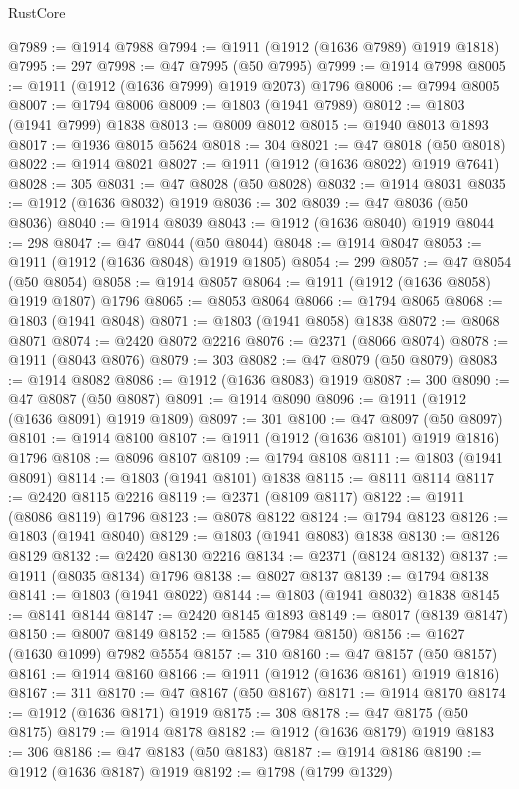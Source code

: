 \begin{lexlean}{RustCore}
\begin{coremodule}
@7989 := @1914 @7988
@7994 := @1911 (@1912 (@1636 @7989) @1919 @1818)
@7995 := 297
@7998 := @47 @7995 (@50 @7995)
@7999 := @1914 @7998
@8005 := @1911 (@1912 (@1636 @7999) @1919 @2073) @1796
@8006 := @7994 @8005
@8007 := @1794 @8006
@8009 := @1803 (@1941 @7989)
@8012 := @1803 (@1941 @7999) @1838
@8013 := @8009 @8012
@8015 := @1940 @8013 @1893
@8017 := @1936 @8015 @5624
@8018 := 304
@8021 := @47 @8018 (@50 @8018)
@8022 := @1914 @8021
@8027 := @1911 (@1912 (@1636 @8022) @1919 @7641)
@8028 := 305
@8031 := @47 @8028 (@50 @8028)
@8032 := @1914 @8031
@8035 := @1912 (@1636 @8032) @1919
@8036 := 302
@8039 := @47 @8036 (@50 @8036)
@8040 := @1914 @8039
@8043 := @1912 (@1636 @8040) @1919
@8044 := 298
@8047 := @47 @8044 (@50 @8044)
@8048 := @1914 @8047
@8053 := @1911 (@1912 (@1636 @8048) @1919 @1805)
@8054 := 299
@8057 := @47 @8054 (@50 @8054)
@8058 := @1914 @8057
@8064 := @1911 (@1912 (@1636 @8058) @1919 @1807) @1796
@8065 := @8053 @8064
@8066 := @1794 @8065
@8068 := @1803 (@1941 @8048)
@8071 := @1803 (@1941 @8058) @1838
@8072 := @8068 @8071
@8074 := @2420 @8072 @2216
@8076 := @2371 (@8066 @8074)
@8078 := @1911 (@8043 @8076)
@8079 := 303
@8082 := @47 @8079 (@50 @8079)
@8083 := @1914 @8082
@8086 := @1912 (@1636 @8083) @1919
@8087 := 300
@8090 := @47 @8087 (@50 @8087)
@8091 := @1914 @8090
@8096 := @1911 (@1912 (@1636 @8091) @1919 @1809)
@8097 := 301
@8100 := @47 @8097 (@50 @8097)
@8101 := @1914 @8100
@8107 := @1911 (@1912 (@1636 @8101) @1919 @1816) @1796
@8108 := @8096 @8107
@8109 := @1794 @8108
@8111 := @1803 (@1941 @8091)
@8114 := @1803 (@1941 @8101) @1838
@8115 := @8111 @8114
@8117 := @2420 @8115 @2216
@8119 := @2371 (@8109 @8117)
@8122 := @1911 (@8086 @8119) @1796
@8123 := @8078 @8122
@8124 := @1794 @8123
@8126 := @1803 (@1941 @8040)
@8129 := @1803 (@1941 @8083) @1838
@8130 := @8126 @8129
@8132 := @2420 @8130 @2216
@8134 := @2371 (@8124 @8132)
@8137 := @1911 (@8035 @8134) @1796
@8138 := @8027 @8137
@8139 := @1794 @8138
@8141 := @1803 (@1941 @8022)
@8144 := @1803 (@1941 @8032) @1838
@8145 := @8141 @8144
@8147 := @2420 @8145 @1893
@8149 := @8017 (@8139 @8147)
@8150 := @8007 @8149
@8152 := @1585 (@7984 @8150)
@8156 := @1627 (@1630 @1099) @7982 @5554
@8157 := 310
@8160 := @47 @8157 (@50 @8157)
@8161 := @1914 @8160
@8166 := @1911 (@1912 (@1636 @8161) @1919 @1816)
@8167 := 311
@8170 := @47 @8167 (@50 @8167)
@8171 := @1914 @8170
@8174 := @1912 (@1636 @8171) @1919
@8175 := 308
@8178 := @47 @8175 (@50 @8175)
@8179 := @1914 @8178
@8182 := @1912 (@1636 @8179) @1919
@8183 := 306
@8186 := @47 @8183 (@50 @8183)
@8187 := @1914 @8186
@8190 := @1912 (@1636 @8187) @1919
@8192 := @1798 (@1799 @1329)

\end{coremodule}
\end{lexlean}
